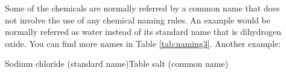 \documentclass[main.tex]{subfiles}
\begin{document}
\begin{description}
\item[] 
Some of the chemicals are normally referred by a common name that does not involve the use of any chemical naming rules. An example would be  normally referred as water instead of its standard name that is dihydrogen oxide. You can find more names in Table \ref{tab:naming3}. Another example:\\
 \begin{namingbox} {}
  \hfill Sodium chloride ({\small standard name})\hfill  Table salt ({\small common name})  
\end{namingbox}
%
 

\end{description}
\end{document}
